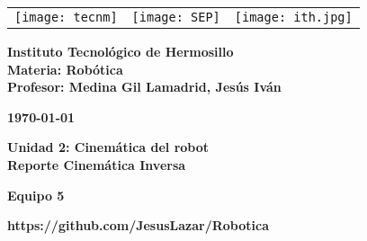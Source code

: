 \begin{titlepage}
	\centering
	\begin{tabular}{@{}p{} p{} p{}@{}}
		\texttt{[image: tecnm]} & 
		\centering \texttt{[image: SEP]} & 
		\raggedleft \texttt{[image: ith.jpg]} \\
	\end{tabular}
	
	\vspace{2em}
	
	\noindent
	\begin{minipage}[t]{0.48\textwidth}
		\raggedright
		\small \textbf{%
			Instituto Tecnológico de Hermosillo\\
			Materia: Robótica\\
			Profesor: Medina Gil Lamadrid, Jesús Iván%
		}
	\end{minipage}%
	\hfill
	\begin{minipage}[t]{0.48\textwidth}
		\raggedleft
		\small \textbf{\today}
	\end{minipage}
	
	\vspace{2em}
	
	{\large \textbf{Unidad 2: Cinemática del robot}}\\
	{\Huge \textbf{Reporte Cinemática Inversa}}
	
	\vspace{1em}
	
	\begin{center}
		{\Large \textbf{Equipo 5}}
	\end{center}
	\begin{center}
		{\Large \textbf{https://github.com/JesusLazar/Robotica}}
	\end{center}
	
	\vspace{1em}
	

\end{titlepage}
